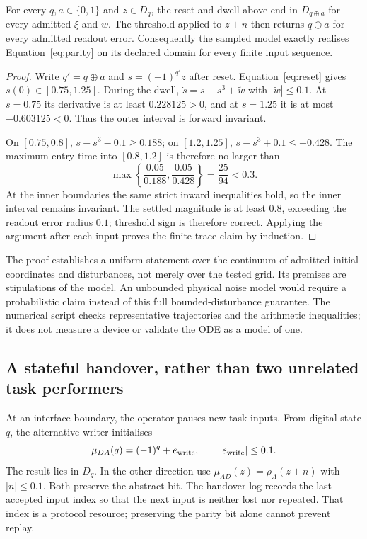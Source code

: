 \begin{theorem}\label{thm:parity}
For every $q,a\in\{0,1\}$ and $z\in D_q$, the reset and dwell above end in $D_{q\oplus a}$ for every admitted $\xi$ and $w$. The threshold applied to $z+n$ then returns $q\oplus a$ for every admitted readout error. Consequently the sampled model exactly realises Equation~\eqref{eq:parity} on its declared domain for every finite input sequence.
\end{theorem}
\begin{proof}
Write $q'=q\oplus a$ and $s=(-1)^{q'}z$ after reset. Equation~\eqref{eq:reset} gives $s(0)\in[0.75,1.25]$. During the dwell,
$\dot s=s-s^3+\widetilde w$ with $|\widetilde w|\leq0.1$.
At $s=0.75$ its derivative is at least $0.228125>0$, and at $s=1.25$ it is at most $-0.603125<0$. Thus the outer interval is forward invariant.

On $[0.75,0.8]$, $s-s^3-0.1\geq0.188$; on $[1.2,1.25]$, $s-s^3+0.1\leq-0.428$. The maximum entry time into $[0.8,1.2]$ is therefore no larger than
\[
 \max\left\{\frac{0.05}{0.188},\frac{0.05}{0.428}\right\}
 =\frac{25}{94}<0.3.
\]
At the inner boundaries the same strict inward inequalities hold, so the inner interval remains invariant. The settled magnitude is at least $0.8$, exceeding the readout error radius $0.1$; threshold sign is therefore correct. Applying the argument after each input proves the finite-trace claim by induction.
\end{proof}
The proof establishes a uniform statement over the continuum of admitted initial coordinates and disturbances, not merely over the tested grid. Its premises are stipulations of the model. An unbounded physical noise model would require a probabilistic claim instead of this full bounded-disturbance guarantee. The numerical script checks representative trajectories and the arithmetic inequalities; it does not measure a device or validate the ODE as a model of one.

\subsection{A stateful handover, rather than two unrelated task performers}
At an interface boundary, the operator pauses new task inputs. From digital state $q$, the alternative writer initialises
\[
 \mu_{D A}(q)=(-1)^q+e_{\rm write},\qquad |e_{\rm write}|\leq0.1.
\]
The result lies in $D_q$. In the other direction use
$\mu_{A D}(z)=\rho_A(z+n)$ with $|n|\leq0.1$. Both preserve the abstract bit. The handover log records the last accepted input index so that the next input is neither lost nor repeated. That index is a protocol resource; preserving the parity bit alone cannot prevent replay.

